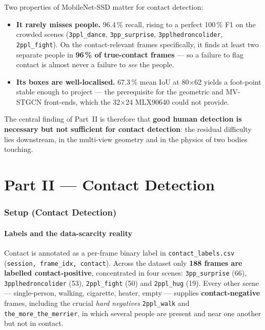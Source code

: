 \documentclass[11pt, a4paper]{article}
\begin{document}
Two properties of MobileNet-SSD matter for contact detection:
\begin{itemize}[leftmargin=2em]
    \item \textbf{It rarely misses people.} 96.4\,\% recall, rising to a perfect
        100\,\% F1 on the crowded scenes (\texttt{3ppl\_dance},
        \texttt{3pp\_surprise}, \texttt{3pplhedroncolider},
        \texttt{2ppl\_fight}). On the contact-relevant frames specifically, it
        finds at least two separate people in \textbf{96\,\% of true-contact
        frames} --- so a failure to flag contact is almost never a failure to
        \emph{see} the people.
    \item \textbf{Its boxes are well-localised.} 67.3\,\% mean IoU at
        80$\times$62 yields a foot-point stable enough to project --- the
        prerequisite for the geometric and MV-STGCN front-ends, which the
        32$\times$24 MLX90640 could not provide.
\end{itemize}

The central finding of Part~II is therefore that \textbf{good human detection
is necessary but not sufficient for contact detection}: the residual difficulty
lies downstream, in the multi-view geometry and in the physics of two bodies
touching.

\part*{Part II — Contact Detection}

\section{Setup (Contact Detection)}

\subsection{Labels and the data-scarcity reality}
Contact is annotated as a per-frame binary label in \texttt{contact\_labels.csv}
(\texttt{session, frame\_idx, contact}). Across the dataset only
\textbf{188 frames are labelled contact-positive}, concentrated in four scenes:
\texttt{3pp\_surprise} (66), \texttt{3pplhedroncolider} (53),
\texttt{2ppl\_fight} (50) and \texttt{2ppl\_hug} (19). Every other scene ---
single-person, walking, cigarette, heater, empty --- supplies
\textbf{contact-negative} frames, including the crucial \emph{hard negatives}
\texttt{2ppl\_walk} and \texttt{the\_more\_the\_merrier}, in which several
people are present and near one another but not in contact.
\end{document}
